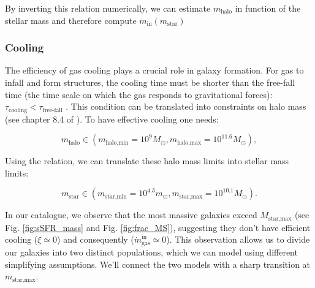 \documentclass[fleqn,usenatbib]{mnras}
\begin{document}
By inverting this relation numerically, we can estimate $m_\text{halo}$ in function of the stellar mass and therefore compute $\dot{m}_\text{in}(m_\text{star})$

\subsubsection{\textbf{Cooling}}

The efficiency of gas cooling plays a crucial role in galaxy formation. For gas to infall and form structures, the cooling time must be shorter than the free-fall time (the time scale on which the gas responds to gravitational forces): $\tau_{\text{cooling}} < \tau_{\text{free-fall}}$ .
This condition can be translated into constraints on halo mass (see chapter 8.4 of \cite{Mo_van}).
To have effective cooling one needs:

\begin{equation}
m_{\text{halo}} \in \left( m_{\text{halo,min}}=10^9 M_\odot , m_{\text{halo,max}}=10^{11.6} M_\odot \right),
\label{eq:halo_mass_minmax}
\end{equation}

Using the \cite{moster_2012} relation, we can translate these halo mass limits into stellar mass limits:

\begin{equation}
m_\text{star} \in \left( m_\text{star,min}=10^{4.3} m_\odot, m_\text{star,max}=10^{10.1} M_\odot \right).
\label{eq:star_mass_minmax}
\end{equation}


In our catalogue, we observe that the most massive galaxies exceed $M_\text{star,max}$ (see Fig. \ref{fig:sSFR_mass} and Fig. \ref{fig:frac_MS}), suggesting they don't have efficient cooling ($\xi \simeq 0$) and consequently ($\dot{m}_\text{gas}^\text{in} \simeq 0$). This observation allows us to divide our galaxies into two distinct populations, which we can model using different simplifying assumptions. We'll connect the two models with a sharp transition at $m_\text{star,max}$. 
\end{document}
